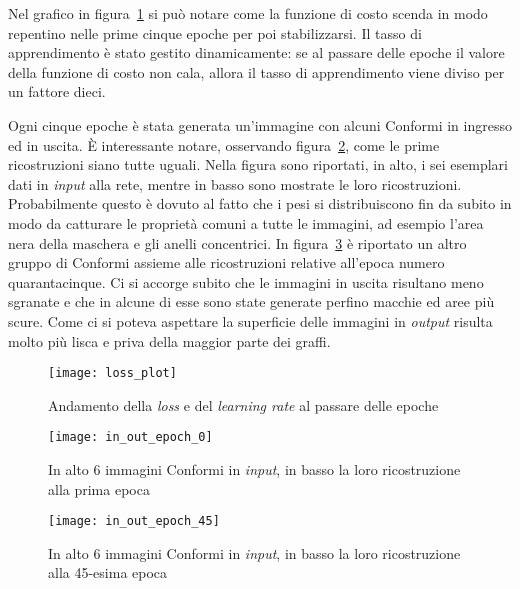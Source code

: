 Nel grafico in figura~\ref{fig:loss_plot} si può notare come la funzione di costo scenda in modo repentino nelle prime cinque epoche per poi stabilizzarsi.
Il tasso di apprendimento è stato gestito dinamicamente: se al passare delle epoche il valore della funzione di costo non cala, allora il tasso di apprendimento viene diviso per un fattore dieci.

Ogni cinque epoche è stata generata un'immagine con alcuni Conformi in ingresso  ed in uscita.
È interessante notare, osservando figura~\ref{fig:epoch_0}, come le prime ricostruzioni siano tutte uguali.
Nella figura sono riportati, in alto, i sei esemplari dati in \textit{input} alla rete, mentre in basso sono mostrate le loro ricostruzioni.
Probabilmente questo è dovuto al fatto che i pesi si distribuiscono fin da subito in modo da catturare le proprietà comuni a tutte le immagini, ad esempio l'area nera della maschera e gli anelli concentrici.
In figura~\ref{fig:epoch_45} è riportato un altro gruppo di Conformi assieme alle ricostruzioni relative all'epoca numero quarantacinque.
Ci si accorge subito che le immagini in uscita risultano meno sgranate e che in alcune di esse sono state generate perfino macchie ed aree più scure.
Come ci si poteva aspettare la superficie delle immagini in \textit{output} risulta molto più lisca e priva della maggior parte dei graffi.

\begin{figure}[ht] %
  \begin{center}
    \texttt{[image: loss\_plot]}
    \caption{Andamento della \textit{loss} e del \textit{learning rate} al passare delle epoche}
    \label{fig:loss_plot}
  \end{center}
\end{figure}

\begin{figure}[ht] %
  \begin{center}
    \texttt{[image: in\_out\_epoch\_0]}
    \caption{In alto 6 immagini Conformi in \textit{input}, in basso la loro ricostruzione alla prima epoca}
    \label{fig:epoch_0}
  \end{center}
\end{figure}

\begin{figure}[ht] %
  \begin{center}
    \texttt{[image: in\_out\_epoch\_45]}
    \caption{In alto 6 immagini Conformi in \textit{input}, in basso la loro ricostruzione alla 45-esima epoca}
    \label{fig:epoch_45}
  \end{center}
\end{figure}

